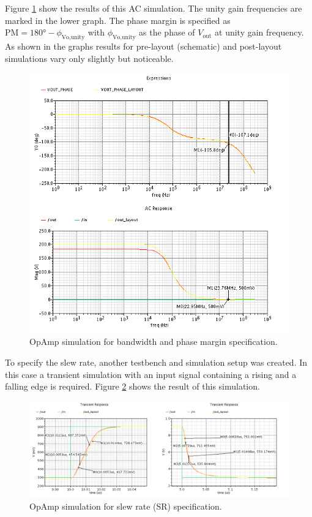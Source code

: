 \documentclass[parskip,oneside,colorbacktitle,10pt,accentcolor=tud1b]{tudreport}
\begin{document}
{Figure \ref{fig:opamp_pm} show the results of this AC simulation. The unity gain frequencies are marked in the lower graph. The phase margin is specified as $\text{PM} = 180° - \phi_\text{Vo,unity}$ with $\phi_\text{Vo,unity}$ as the phase of $V_\text{out}$ at unity gain frequency. As shown in the graphs results for pre-layout (schematic) and post-layout simulations vary only slightly but noticeable.

\begin{figure}[H]
	\begin{center}
		\includegraphics[scale=0.60]{opamp_pm}
	    \caption{OpAmp simulation for bandwidth and phase margin specification.}
	    \label{fig:opamp_pm}		
	\end{center}
\end{figure}

To specify the slew rate, another testbench and simulation setup was created. In this case a transient simulation with an input signal containing a rising and a falling edge is required. Figure \ref{fig:opamp_sr} shows the result of this simulation. 

\begin{figure}[H]
	\begin{center}
		\includegraphics[width=\linewidth]{opamp_sr}
	    \caption{OpAmp simulation for slew rate (SR) specification.}
	    \label{fig:opamp_sr}
	\end{center}
\end{figure}

}
\end{document}
